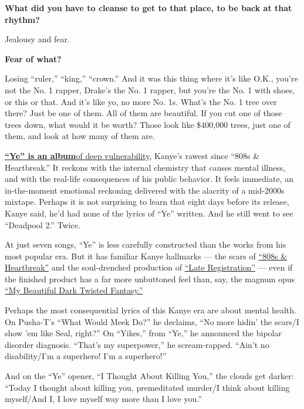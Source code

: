 \textbf{What did you have to cleanse to get to that place, to be back at
that rhythm?}

Jealousy and fear.

\textbf{Fear of what?}

Losing ``ruler,'' ``king,'' ``crown.'' And it was this thing where it's
like O.K., you're not the No. 1 rapper, Drake's the No. 1 rapper, but
you're the No. 1 with shoes, or this or that. And it's like yo, no more
No. 1s. What's the No. 1 tree over there? Just be one of them. All of
them are beautiful. If you cut one of those trees down, what would it be
worth? Those look like \$400,000 trees, just one of them, and look at
how many of them are.

\textbf{\href{https://www.nytimes3xbfgragh.onion/2018/06/06/arts/music/popcast-kanye-west-ye.html}{``Ye''
is an
album}}\href{https://www.nytimes3xbfgragh.onion/2018/06/06/arts/music/popcast-kanye-west-ye.html}{of
deep vulnerability}, Kanye's rawest since ``808s \& Heartbreak.'' It
reckons with the internal chemistry that causes mental illness, and with
the real-life consequences of his public behavior. It feels immediate,
an in-the-moment emotional reckoning delivered with the alacrity of a
mid-2000s mixtape. Perhaps it is not surprising to learn that eight days
before its release, Kanye said, he'd had none of the lyrics of ``Ye''
written. And he still went to see ``Deadpool 2.'' Twice.

At just seven songs, ``Ye'' is less carefully constructed than the works
from his most popular era. But it has familiar Kanye hallmarks --- the
scars of
\href{https://www.nytimes3xbfgragh.onion/2008/11/25/arts/music/25kany.html}{``808s
\& Heartbreak''} and the soul-drenched production of
\href{https://www.nytimes3xbfgragh.onion/2005/07/24/arts/music/kanye-wests-argument-with-himself.html}{``Late
Registration''} --- even if the finished product has a far more
unbuttoned feel than, say, the magnum opus
\href{https://www.nytimes3xbfgragh.onion/2011/01/03/arts/music/03kanye.html}{``My
Beautiful Dark Twisted Fantasy.''}

Perhaps the most consequential lyrics of this Kanye era are about mental
health. On Pusha-T's ``What Would Meek Do?'' he declaims, ``No more
hidin' the scars/I show 'em like Seal, right?'' On ``Yikes,'' from
``Ye,'' he announced the bipolar disorder diagnosis. ``That's my
superpower,'' he scream-rapped. ``Ain't no disability/I'm a superhero!
I'm a superhero!''

And on the ``Ye'' opener, ``I Thought About Killing You,'' the clouds
get darker: ``Today I thought about killing you, premeditated murder/I
think about killing myself/And I, I love myself way more than I love
you.''

